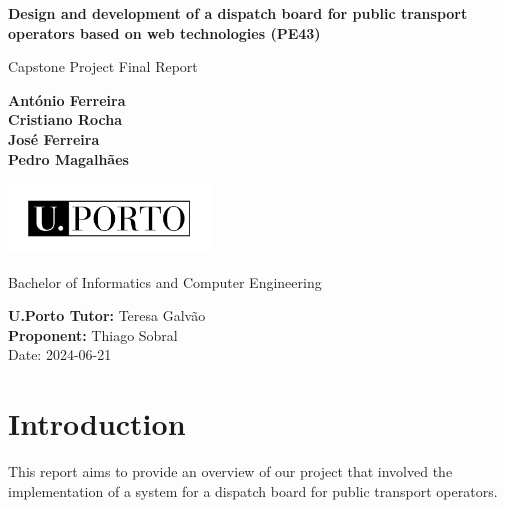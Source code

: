 \documentclass[10pt]{article}
\begin{document}
\begin{titlepage}
    \begin{center}
        \vspace*{1cm}
    {\fontsize{17}{16}\selectfont \textbf{Design and development of a dispatch board for public transport operators based on web technologies (PE43)}}

        \vspace{0.5cm}
        Capstone Project Final Report

        \vspace{1.5cm}

        \textbf{António Ferreira} \\
        \textbf{Cristiano Rocha} \\
        \textbf{José Ferreira} \\
        \textbf{Pedro Magalhães} \\

                \vfill

        \includegraphics[width=0.4\textwidth]{UPORTO_fundotransparente}


        Bachelor of Informatics and Computer Engineering

        \vspace{0.8cm}

        \textbf{U.Porto Tutor:} Teresa Galvão \\
        \textbf{Proponent:} Thiago Sobral \\

    \vspace{0.4cm}
        Date: 2024-06-21

    \end{center}
\end{titlepage}

\thispagestyle{empty}
\clearpage

\thispagestyle{empty}
\tableofcontents

\clearpage

\section{Introduction}
    This report aims to provide an overview of our project that involved the implementation of a system for a dispatch board for public transport operators.
\end{document}
